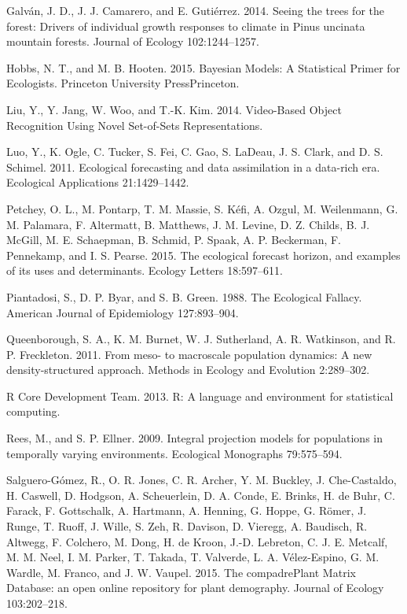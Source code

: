 \documentclass[12pt,]{article}
\begin{document}
Galván, J. D., J. J. Camarero, and E. Gutiérrez. 2014. Seeing the trees
for the forest: Drivers of individual growth responses to climate in
Pinus uncinata mountain forests. Journal of Ecology 102:1244--1257.

Hobbs, N. T., and M. B. Hooten. 2015. Bayesian Models: A Statistical
Primer for Ecologists. Princeton University PressPrinceton.

Liu, Y., Y. Jang, W. Woo, and T.-K. Kim. 2014. Video-Based Object
Recognition Using Novel Set-of-Sets Representations.

Luo, Y., K. Ogle, C. Tucker, S. Fei, C. Gao, S. LaDeau, J. S. Clark, and
D. S. Schimel. 2011. Ecological forecasting and data assimilation in a
data-rich era. Ecological Applications 21:1429--1442.

Petchey, O. L., M. Pontarp, T. M. Massie, S. Kéfi, A. Ozgul, M.
Weilenmann, G. M. Palamara, F. Altermatt, B. Matthews, J. M. Levine, D.
Z. Childs, B. J. McGill, M. E. Schaepman, B. Schmid, P. Spaak, A. P.
Beckerman, F. Pennekamp, and I. S. Pearse. 2015. The ecological forecast
horizon, and examples of its uses and determinants. Ecology Letters
18:597--611.

Piantadosi, S., D. P. Byar, and S. B. Green. 1988. The Ecological
Fallacy. American Journal of Epidemiology 127:893--904.

Queenborough, S. A., K. M. Burnet, W. J. Sutherland, A. R. Watkinson,
and R. P. Freckleton. 2011. From meso- to macroscale population
dynamics: A new density-structured approach. Methods in Ecology and
Evolution 2:289--302.

R Core Development Team. 2013. R: A language and environment for
statistical computing.

Rees, M., and S. P. Ellner. 2009. Integral projection models for
populations in temporally varying environments. Ecological Monographs
79:575--594.

Salguero-Gómez, R., O. R. Jones, C. R. Archer, Y. M. Buckley, J.
Che-Castaldo, H. Caswell, D. Hodgson, A. Scheuerlein, D. A. Conde, E.
Brinks, H. de Buhr, C. Farack, F. Gottschalk, A. Hartmann, A. Henning,
G. Hoppe, G. Römer, J. Runge, T. Ruoff, J. Wille, S. Zeh, R. Davison, D.
Vieregg, A. Baudisch, R. Altwegg, F. Colchero, M. Dong, H. de Kroon,
J.-D. Lebreton, C. J. E. Metcalf, M. M. Neel, I. M. Parker, T. Takada,
T. Valverde, L. A. Vélez-Espino, G. M. Wardle, M. Franco, and J. W.
Vaupel. 2015. The compadrePlant Matrix Database: an open online
repository for plant demography. Journal of Ecology 103:202--218.
\end{document}
